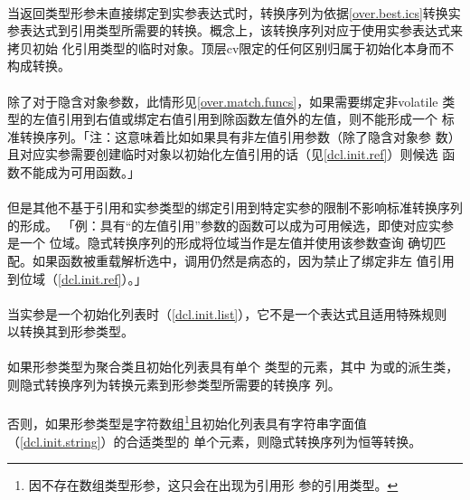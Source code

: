 \paragraph{}
当返回类型形参未直接绑定到实参表达式时，转换序列为依据\ref{over.best.ics}转换实
参表达式到引用类型所需要的转换。概念上，该转换序列对应于使用实参表达式来拷贝初始
化引用类型的临时对象。顶层cv限定的任何区别归属于初始化本身而不构成转换。

\paragraph{}
除了对于隐含对象参数，此情形见\ref{over.match.funcs}，如果需要绑定非volatile
类型的左值引用到右值或绑定右值引用到除函数左值外的左值，则不能形成一个
标准转换序列。「注：这意味着比如如果具有非左值引用参数（除了隐含对象参
数）且对应实参需要创建临时对象以初始化左值引用的话（见\ref{dcl.init.ref}）则候选
函数不能成为可用函数。」

\paragraph{}
但是其他不基于引用和实参类型的绑定引用到特定实参的限制不影响标准转换序列的形成。
「例：具有``的左值引用''参数的函数可以成为可用候选，即使对应实参是一个
位域。隐式转换序列的形成将位域当作是左值并使用该参数查询
确切匹配。如果函数被重载解析选中，调用仍然是病态的，因为禁止了绑定非左
值引用到位域（\ref{dcl.init.ref}）。」

\paragraph{}
当实参是一个初始化列表时（\ref{dcl.init.list}），它不是一个表达式且适用特殊规则
以转换其到形参类型。

\paragraph{}
如果形参类型为聚合类且初始化列表具有单个 类型的元素，其中
为或的派生类，则隐式转换序列为转换元素到形参类型所需要的转换序
列。

\paragraph{}
否则，如果形参类型是字符数组\footnote{因不存在数组类型形参，这只会在出现为引用形
参的引用类型。}且初始化列表具有字符串字面值（\ref{dcl.init.string}）的合适类型的
单个元素，则隐式转换序列为恒等转换。

